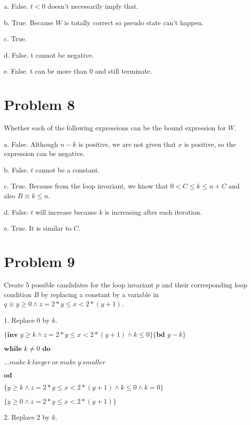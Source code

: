 \documentclass{article}
\begin{document}
a. False. $t<0$ doesn't necessarily imply that.

b. True. Because $W$ is totally correct so pseudo state can't happen.

c. True.

d. False. t cannot be negative.

e. False. t can be more than 0 and still terminate.


\section*{Problem 8}

Whether each of the following expressions can be the bound expression for $W$.

a. False. Although $n-k$ is positive, we are not given that $x$ is positive, so the expression can be negative.

b. False. $t$ cannot be a constant.

c. True. Because from the loop invariant, we know that $0<C \leq k \leq n+C$ and also $B \equiv k \leq n$.

d. False. $t$ will increase because $k$ is increasing after each iteration.

e. True. It is similar to $C$.


\section*{Problem 9}

Create 5 possible candidates for the loop invariant $p$ and their corresponding loop condition $B$ by replacing a constant by a variable in $q \equiv y \geq 0 \wedge z=2*y \leq x < 2*(y+1)$.

\vspace{10pt}

1. Replace $0$ by $k$.
\vspace{10pt}

$\{\textbf{inv } y \geq k \wedge z=2*y \leq x < 2*(y+1) \wedge k \leq 0\} \{\textbf{bd } y-k\}$

$\textbf{while } k \neq 0 \textbf{ do}$

\qquad \qquad $...make\ k\ larger\ or\ make\ y\ smaller$

$\textbf{od}$

$\{y \geq k \wedge z=2*y \leq x < 2*(y+1) \wedge k \leq 0 \wedge k=0\}$

$\{y \geq 0 \wedge z=2*y \leq x < 2*(y+1)\}$

\vspace{10pt}
2. Replace $2$ by $k$.
\vspace{10pt}
\end{document}
